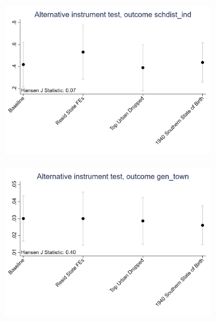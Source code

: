\documentclass{article}
\begin{document}
\begin{figure}[htbp]
\begin{subfigure}{0.3\textwidth}
        \includegraphics[width=\linewidth]{exhibits/figures/exogeneity_tests/D16_alt_inst_pooled_schdist_ind.png}
        \label{fig:sub3}
    \end{subfigure}
    \begin{subfigure}{0.3\textwidth}
        \includegraphics[width=\linewidth]{exhibits/figures/exogeneity_tests/D16_alt_inst_pooled_gen_town.png}
        \label{fig:sub5}
    \end{subfigure}
    \begin{subfigure}{0.3\textwidth}

\end{subfigure}
\end{figure}
\end{document}
